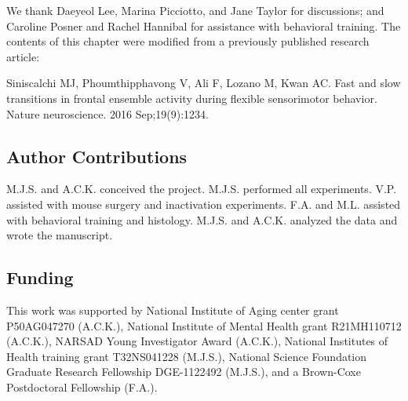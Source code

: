 
We thank Daeyeol Lee, Marina Picciotto, and Jane Taylor for discussions; and Caroline Posner and Rachel Hannibal for assistance with behavioral training. The contents of this chapter were modified from a previously published research article: 

\smallskip 
\begin{singlespace}
Siniscalchi MJ, Phoumthipphavong V, Ali F, Lozano M, Kwan AC. Fast and slow transitions in frontal ensemble activity during flexible sensorimotor behavior. Nature neuroscience. 2016 Sep;19(9):1234.
\end{singlespace}

\subsection*{Author Contributions}
M.J.S. and A.C.K. conceived the project. M.J.S. performed all experiments. V.P. assisted with mouse surgery and inactivation experiments. F.A. and M.L. assisted with behavioral training and histology. M.J.S. and A.C.K. analyzed the data and wrote the manuscript.

\subsection*{Funding}
This work was supported by National Institute of Aging center grant P50AG047270 (A.C.K.), National Institute of Mental Health grant R21MH110712 (A.C.K.), NAR\-SAD Young Investigator Award (A.C.K.), National Institutes of Health training grant T32NS041228 (M.J.S.), National Science Foundation Graduate Research Fellowship DGE-1122492 (M.J.S.), and a Brown-Coxe Postdoctoral Fellowship (F.A.).

